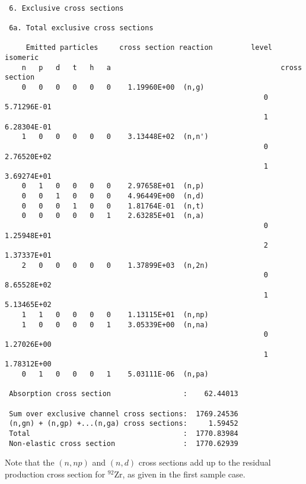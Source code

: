 \begin{samplecase}
{\small \begin{verbatim}

 6. Exclusive cross sections

 6a. Total exclusive cross sections

     Emitted particles     cross section reaction         level    isomeric   
    n   p   d   t   h   a                                        cross section
    0   0   0   0   0   0    1.19960E+00  (n,g)                               
                                                             0     5.71296E-01
                                                             1     6.28304E-01
    1   0   0   0   0   0    3.13448E+02  (n,n')                              
                                                             0     2.76520E+02
                                                             1     3.69274E+01
    0   1   0   0   0   0    2.97658E+01  (n,p)                               
    0   0   1   0   0   0    4.96449E+00  (n,d)                               
    0   0   0   1   0   0    1.81764E-01  (n,t)                               
    0   0   0   0   0   1    2.63285E+01  (n,a)                               
                                                             0     1.25948E+01
                                                             2     1.37337E+01
    2   0   0   0   0   0    1.37899E+03  (n,2n)                              
                                                             0     8.65528E+02
                                                             1     5.13465E+02
    1   1   0   0   0   0    1.13115E+01  (n,np)                              
    1   0   0   0   0   1    3.05339E+00  (n,na)                              
                                                             0     1.27026E+00
                                                             1     1.78312E+00
    0   1   0   0   0   1    5.03111E-06  (n,pa)                              

 Absorption cross section                 :    62.44013

 Sum over exclusive channel cross sections:  1769.24536
 (n,gn) + (n,gp) +...(n,ga) cross sections:     1.59452
 Total                                    :  1770.83984
 Non-elastic cross section                :  1770.62939
\end{verbatim} } \renewcommand{\baselinestretch}{1.07}\small\normalsize
\noindent
Note that the $(n,np)$ and $(n,d)$ cross sections add up to the residual 
production cross section for ${}^{92}$Zr, as given in the first sample case.


\end{samplecase}
